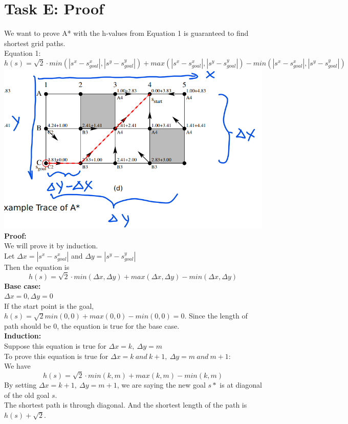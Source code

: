 \documentclass[12pt, letterpaper]{article}
\begin{document}
\section{Task E: Proof}
We want to prove A* with the h-values from Equation 1 is
guaranteed to find shortest grid paths.\\
Equation 1:
$$h(s)=\sqrt{2} \cdot min(|s^x-s^x_{goal}|,|s^y-s^y_{goal}|) +max(|s^x-s^x_{goal}|,|s^y-s^y_{goal}|)-min(|s^x-s^x_{goal}|,|s^y-s^y_{goal}|)$$
\includegraphics[width=15cm]{image-1e}\\
\textbf{Proof:}\\
We will prove it by induction.\\
Let $\Delta x=|s^x-s^x_{goal}|$ and $\Delta y=|s^y-s^y_{goal}|$\\
Then the equation is\\
$$h(s)=\sqrt 2 \cdot min(\Delta x,\Delta y)+max(\Delta x,\Delta y)-min(\Delta x,\Delta y)$$
\textbf{Base case:}\\
$\Delta x=0,\Delta y=0$\\
If the start point is the goal, $h(s)=\sqrt 2 min(0,0)+max(0,0)-min(0,0)=0$.
Since the length of path should be 0, the equation is true for the base case.\\
\textbf{Induction:}\\
Suppose this equation is true for $\Delta x=k,\ \Delta y=m$\\
To prove this equation is true for $\Delta x=k\ and\ k+1,\ \Delta y=m\ and\ m+1$:\\
We have 
$$h(s)=\sqrt 2 \cdot min(k,m)+max(k,m)-min(k,m)$$
By setting $\Delta x=k+1,\ \Delta y=m+1$, we are saying the new goal $s*$ is at diagonal of the old goal $s$.\\
The shortest path is through diagonal. And the shortest length of the path is $h(s)+\sqrt 2$. \\
\end{document}
